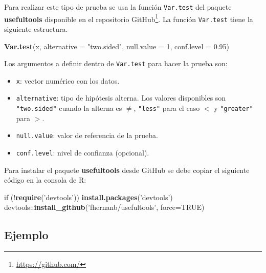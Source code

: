 \documentclass[10pt,]{krantz}
\makeatletter
\newenvironment{Shaded}{\begin{snugshade}}{\end{snugshade}}
\newcommand{\KeywordTok}[1]{\textcolor[rgb]{0.13,0.29,0.53}{\textbf{{#1}}}}
\newcommand{\DataTypeTok}[1]{\textcolor[rgb]{0.13,0.29,0.53}{{#1}}}
\newcommand{\DecValTok}[1]{\textcolor[rgb]{0.00,0.00,0.81}{{#1}}}
\newcommand{\FloatTok}[1]{\textcolor[rgb]{0.00,0.00,0.81}{{#1}}}
\newcommand{\StringTok}[1]{\textcolor[rgb]{0.31,0.60,0.02}{{#1}}}
\newcommand{\OtherTok}[1]{\textcolor[rgb]{0.56,0.35,0.01}{{#1}}}
\newcommand{\NormalTok}[1]{{#1}}
\providecommand{\tightlist}{%
  \setlength{\itemsep}{0pt}\setlength{\parskip}{0pt}}
\let\proglang=\textsf
\renewcommand{\href}[2]{#2\footnote{\url{#1}}}
\newenvironment{kframe}{%
\medskip{}
\setlength{\fboxsep}{.8em}
 \def\at@end@of@kframe{}%
 \ifinner\ifhmode%
  \def\at@end@of@kframe{\end{minipage}}%
  \begin{minipage}{\columnwidth}%
 \fi\fi%
 \def\FrameCommand##1{\hskip\@totalleftmargin \hskip-\fboxsep
 \colorbox{shadecolor}{##1}\hskip-\fboxsep
     \hskip-\linewidth \hskip-\@totalleftmargin \hskip\columnwidth}%
 \MakeFramed {\advance\hsize-\width
   \@totalleftmargin\z@ \linewidth\hsize
   \@setminipage}}%
 {\par\unskip\endMakeFramed%
 \at@end@of@kframe}
\renewenvironment{Shaded}{\begin{kframe}}{\end{kframe}}
\makeatother
\begin{document}
Para realizar este tipo de prueba se usa la función \texttt{Var.test}
del paquete \textbf{usefultools} \citep{R-usefultools} disponible en el
repositorio \href{https://github.com/}{GitHub}. La función
\texttt{Var.test} tiene la siguiente estructura.

\begin{Shaded}
\begin{Highlighting}[]
\KeywordTok{Var.test}\NormalTok{(x, }\DataTypeTok{alternative =} \StringTok{"two.sided"}\NormalTok{, }\DataTypeTok{null.value =} \DecValTok{1}\NormalTok{, }\DataTypeTok{conf.level =} \FloatTok{0.95}\NormalTok{)}
\end{Highlighting}
\end{Shaded}

Los argumentos a definir dentro de \texttt{Var.test} para hacer la
prueba son:

\begin{itemize}
\tightlist
\item
  \texttt{x}: vector numérico con los datos.
\item
  \texttt{alternative}: tipo de hipótesis alterna. Los valores
  disponibles son \texttt{"two.sided"} cuando la alterna es \(\neq\),
  \texttt{"less"} para el caso \(<\) y \texttt{"greater"} para \(>\).
\item
  \texttt{null.value}: valor de referencia de la prueba.
\item
  \texttt{conf.level}: nivel de confianza (opcional).
\end{itemize}

Para instalar el paquete \textbf{usefultools} desde GitHub se debe
copiar el siguiente código en la consola de \proglang{R}:

\begin{Shaded}
\begin{Highlighting}[]
\NormalTok{if (!}\KeywordTok{require}\NormalTok{(}\StringTok{'devtools'}\NormalTok{)) }\KeywordTok{install.packages}\NormalTok{(}\StringTok{'devtools'}\NormalTok{)}
\NormalTok{devtools::}\KeywordTok{install_github}\NormalTok{(}\StringTok{'fhernanb/usefultools'}\NormalTok{, }\DataTypeTok{force=}\OtherTok{TRUE}\NormalTok{)}
\end{Highlighting}
\end{Shaded}

\subsection*{Ejemplo}\label{ejemplo-64}
\end{document}
